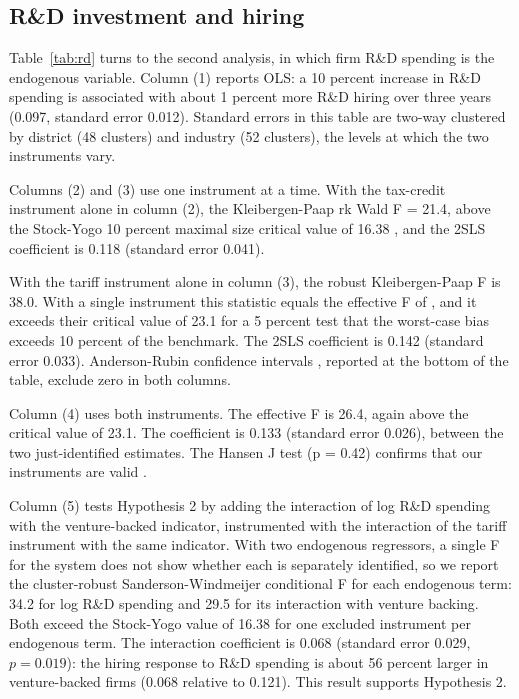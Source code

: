 \documentclass[11pt]{article}
\begin{document}
\subsection{R\&D investment and hiring}

Table~\ref{tab:rd} turns to the second analysis, in which firm R\&D spending is the endogenous variable. Column (1) reports OLS: a 10 percent increase in R\&D spending is associated with about 1 percent more R\&D hiring over three years (0.097, standard error 0.012). Standard errors in this table are two-way clustered by district (48 clusters) and industry (52 clusters), the levels at which the two instruments vary.

Columns (2) and (3) use one instrument at a time. With the tax-credit instrument alone in column (2), the Kleibergen-Paap rk Wald F = 21.4, above the Stock-Yogo 10 percent maximal size critical value of 16.38 \citep{kleibergen2006,stock2005}, and the 2SLS coefficient is 0.118 (standard error 0.041).

With the tariff instrument alone in column (3), the robust Kleibergen-Paap F is 38.0. With a single instrument this statistic equals the effective F of \citet{olea2013}, and it exceeds their critical value of 23.1 for a 5 percent test that the worst-case bias exceeds 10 percent of the benchmark. The 2SLS coefficient is 0.142 (standard error 0.033). Anderson-Rubin confidence intervals \citep{anderson1949}, reported at the bottom of the table, exclude zero in both columns.

Column (4) uses both instruments. The effective F is 26.4, again above the critical value of 23.1. The coefficient is 0.133 (standard error 0.026), between the two just-identified estimates. The Hansen J test (p = 0.42) confirms that our instruments are valid \citep{hansen1982}.

Column (5) tests Hypothesis 2 by adding the interaction of log R\&D spending with the venture-backed indicator, instrumented with the interaction of the tariff instrument with the same indicator. With two endogenous regressors, a single F for the system does not show whether each is separately identified, so we report the cluster-robust Sanderson-Windmeijer conditional F \citep{sanderson2016} for each endogenous term: 34.2 for log R\&D spending and 29.5 for its interaction with venture backing. Both exceed the Stock-Yogo value of 16.38 for one excluded instrument per endogenous term. The interaction coefficient is 0.068 (standard error 0.029, $p = 0.019$): the hiring response to R\&D spending is about 56 percent larger in venture-backed firms (0.068 relative to 0.121). This result supports Hypothesis 2.
\end{document}
